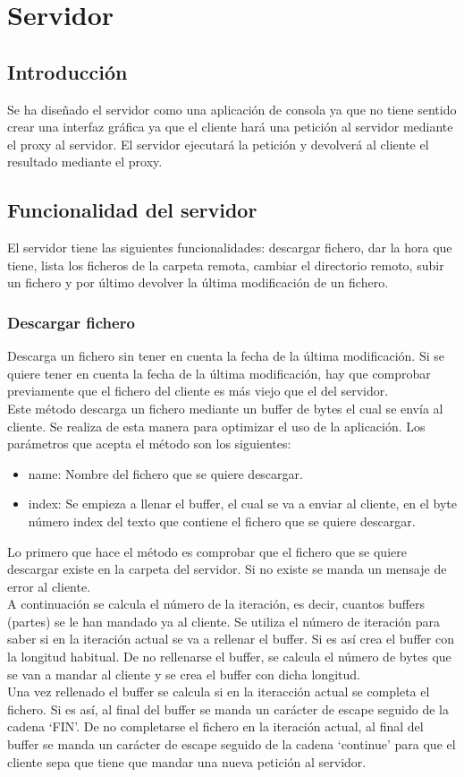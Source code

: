 \chapter{Servidor}
\section{Introducción}
Se ha diseñado el servidor como una aplicación de consola ya que no tiene sentido crear una interfaz gráfica ya que el cliente hará una petición al servidor mediante el proxy al servidor. El servidor ejecutará la petición y devolverá al cliente el resultado mediante el proxy.

\section{Funcionalidad del servidor}
El servidor tiene las siguientes funcionalidades: descargar fichero, dar la hora que tiene, lista los ficheros de la carpeta remota, cambiar el directorio remoto, subir un fichero y por último devolver la última modificación de un fichero.

\subsection{Descargar fichero}
Descarga un fichero sin tener en cuenta la fecha de la última modificación. Si se quiere tener en cuenta la fecha de la última modificación, hay que comprobar previamente que el fichero del cliente es más viejo que el del servidor.
\\
Este método descarga un fichero mediante un buffer de bytes el cual se envía al cliente. Se realiza de esta manera para optimizar el uso de la aplicación. Los parámetros que acepta el método son los siguientes:
\begin{itemize}
	\item name: Nombre del fichero que se quiere descargar.
	\item index: Se empieza a llenar el buffer, el cual se va a enviar al cliente, en el byte número index del texto que contiene el fichero que se quiere descargar.
\end{itemize}
Lo primero que hace el método es comprobar que el fichero que se quiere descargar existe en la carpeta del servidor. Si no existe se manda un mensaje de error al cliente.\\ A continuación se calcula el número de la iteración, es decir, cuantos buffers (partes) se le han mandado ya al cliente. Se utiliza el número de iteración para saber si en la iteración actual se va a rellenar el buffer. Si es así crea el buffer con la longitud habitual. De no rellenarse el buffer, se calcula el número de bytes que se van a mandar al cliente y se crea el buffer con dicha longitud.\\ Una vez rellenado el buffer se calcula si en la iteracción actual se completa el fichero. Si es así, al final del buffer se manda un carácter de escape seguido de la cadena `FIN'. De no completarse el fichero en la iteración actual, al final del buffer se manda un carácter de escape seguido de la cadena `continue' para que el cliente sepa que tiene que mandar una nueva petición al servidor.

